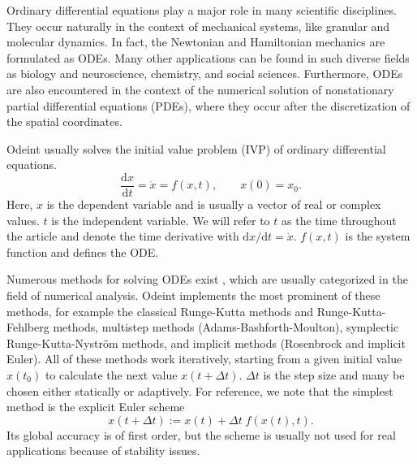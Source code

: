 \documentclass[final]{siamltex}
\newcommand {\de} {\mbox{d}}
\begin{document}
Ordinary differential equations play a major role in many scientific
disciplines. They occur naturally in the context of mechanical
systems, like granular and molecular dynamics. In fact, the Newtonian
and Hamiltonian mechanics are formulated as ODEs.
Many other applications can be found in such diverse
fields as biology and neuroscience, chemistry, and social sciences. %
Furthermore, ODEs are also encountered in the context of the numerical solution of nonstationary partial
differential equations (PDEs), where they occur after the discretization of the spatial coordinates. %

Odeint usually solves %
the initial value problem (IVP) of ordinary differential equations.
\begin{equation}
\frac{\de x}{\de t } = \dot{x} = f(x , t), \quad \quad x(0) =
x_0.
\label{eq:ode}
\end{equation}
Here, $x$ is the dependent variable and is usually a vector of real or complex values.
$t$ is the independent variable. We will refer to $t$ as the time throughout the article and
denote the time derivative with $\de x / \de t = \dot{x}$. $f(x,t)$ is
the system function and defines the ODE.

Numerous methods for solving ODEs exist \cite{HairerSolvingODEI,
  HairerSolvingODEII, HairerGeometricNumericalIntegration2006}, %
which are usually categorized in the field of numerical analysis.
Odeint
implements the most prominent of these methods, for example the
classical Runge-Kutta methods and Runge-Kutta-Fehlberg methods,
multistep methods (Adams-Bashforth-Moulton), symplectic
Runge-Kutta-Nystr\"om methods, and implicit methods (Rosenbrock and
implicit Euler). All of these methods work iteratively, starting
from a given initial value $x(t_0)$ to calculate the next value
$x(t+\Delta t)$.
$\Delta t$ is the step size and many be chosen either statically or adaptively.
For reference, we note that the simplest method is the explicit Euler scheme
\begin{equation}
x\left(t+\Delta t\right) := x(t) + \Delta t \; f(x(t),t) .
\label{eq:euler}
\end{equation}
Its global accuracy is of first order, but the scheme is usually not used for real applications because of stability issues.
\end{document}
